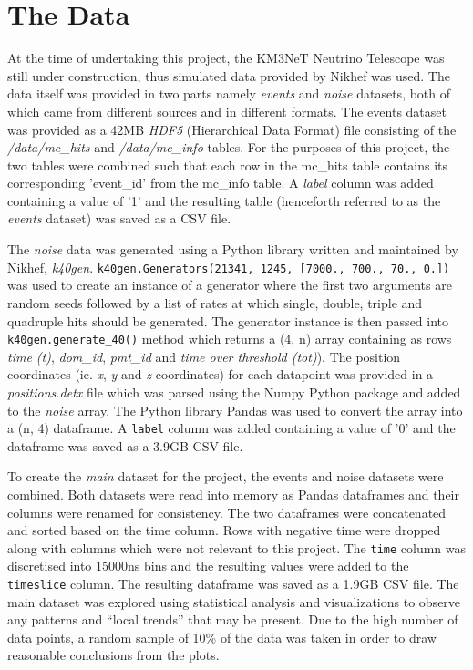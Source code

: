 
\chapter{The Data} %
\label{cha:data}


At the time of undertaking this project, the KM3NeT Neutrino Telescope
was still under construction, thus simulated data provided by Nikhef
was used. The data itself was provided in two parts namely
\emph{events} and \emph{noise} datasets, both of which came from
different sources and in different formats. The events dataset was
provided as a 42MB \emph{HDF5} (Hierarchical Data Format) file
consisting of the \emph{/data/mc\_hits} and \emph{/data/mc\_info}
tables. For the purposes of this project, the two tables were combined
such that each row in the mc\_hits table contains its corresponding
'event\_id' from the mc\_info table. A \emph{label} column was added
containing a value of '1' and the resulting table (henceforth referred
to as the \emph{events} dataset) was saved as a CSV file.

The \emph{noise} data was generated using a Python library written and
maintained by Nikhef, \emph{k40gen}.
\texttt{k40gen.Generators(21341, 1245, [7000., 700., 70., 0.])} was
used to create an instance of a generator where the first two
arguments are random seeds followed by a list of rates at which
single, double, triple and quadruple hits should be generated. The
generator instance is then passed into \texttt{k40gen.generate\_40()}
method which returns a (4, n) array containing as rows \emph{time
(t)}, \emph{dom\_id}, \emph{pmt\_id} and \emph{time over threshold
(tot)}). The position coordinates (ie. \emph{x}, \emph{y} and \emph{z}
coordinates) for each datapoint was provided in a
\emph{positions.detx} file which was parsed using the Numpy Python
package \cite{numpy} and added to the \emph{noise} array. The Python
library Pandas \cite{pandas} was used to convert the array into a (n,
4) dataframe. A \texttt{label} column was added containing a value of
'0' and the dataframe was saved as a 3.9GB CSV file.

To create the \emph{main} dataset for the project, the events and
noise datasets were combined. Both datasets were read into memory as
Pandas dataframes and their columns were renamed for consistency. The
two dataframes were concatenated and sorted based on the time column.
Rows with negative time were dropped along with columns which were not
relevant to this project. The \texttt{time} column was discretised
into 15000ns bins and the resulting values were added to the
\texttt{timeslice} column. The resulting dataframe was saved as a
1.9GB CSV file. The main dataset was explored using statistical
analysis and visualizations to observe any patterns and ``local
trends'' that may be present. Due to the high number of data points, a
random sample of 10\% of the data was taken in order to draw
reasonable conclusions from the plots.

